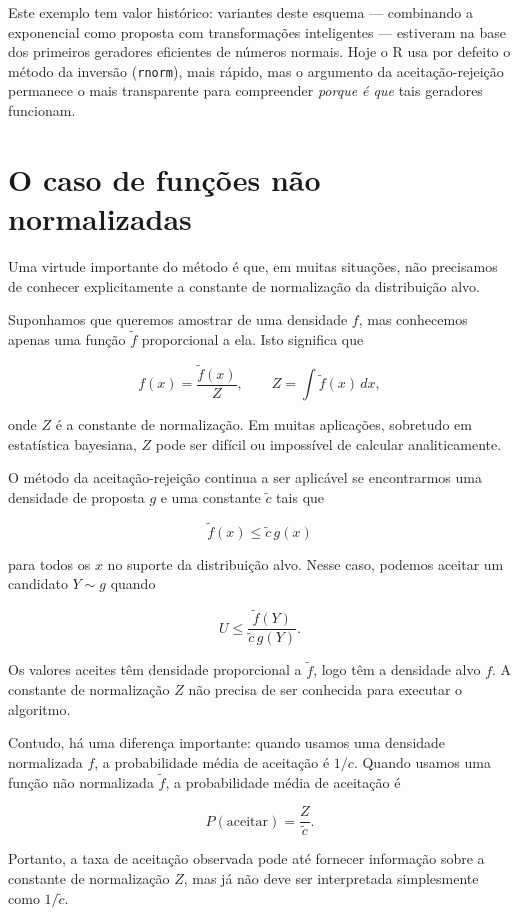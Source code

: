 \documentclass[
  portuguese,
  11pt,
  openany]{book}
\begin{document}
Este exemplo tem valor histórico: variantes deste esquema --- combinando a
exponencial como proposta com transformações inteligentes --- estiveram na base
dos primeiros geradores eficientes de números normais. Hoje o R usa por defeito
o método da inversão (\texttt{rnorm}), mais rápido, mas o argumento da
aceitação-rejeição permanece o mais transparente para compreender \emph{porque é que}
tais geradores funcionam.

\section{O caso de funções não normalizadas}\label{o-caso-de-funuxe7uxf5es-nuxe3o-normalizadas}

Uma virtude importante do método é que, em muitas situações, não precisamos de
conhecer explicitamente a constante de normalização da distribuição alvo.

Suponhamos que queremos amostrar de uma densidade \(f\), mas conhecemos apenas
uma função \(\tilde f\) proporcional a ela. Isto significa que

\[
f(x)=\frac{\tilde f(x)}{Z},
\qquad
Z=\int \tilde f(x)\,dx,
\]

onde \(Z\) é a constante de normalização. Em muitas aplicações, sobretudo em
estatística bayesiana, \(Z\) pode ser difícil ou impossível de calcular
analiticamente.

O método da aceitação-rejeição continua a ser aplicável se encontrarmos uma
densidade de proposta \(g\) e uma constante \(\tilde c\) tais que

\[
\tilde f(x) \leq \tilde c\,g(x)
\]

para todos os \(x\) no suporte da distribuição alvo. Nesse caso, podemos aceitar
um candidato \(Y\sim g\) quando

\[
U \leq \frac{\tilde f(Y)}{\tilde c\,g(Y)}.
\]

Os valores aceites têm densidade proporcional a \(\tilde f\), logo têm a
densidade alvo \(f\). A constante de normalização \(Z\) não precisa de ser
conhecida para executar o algoritmo.

Contudo, há uma diferença importante: quando usamos uma densidade normalizada
\(f\), a probabilidade média de aceitação é \(1/c\). Quando usamos uma função
não normalizada \(\tilde f\), a probabilidade média de aceitação é

\[
P(\text{aceitar})=\frac{Z}{\tilde c}.
\]

Portanto, a taxa de aceitação observada pode até fornecer informação sobre a
constante de normalização \(Z\), mas já não deve ser interpretada simplesmente
como \(1/\tilde c\).
\end{document}
